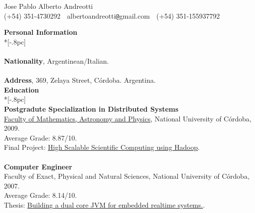 \documentclass[letter,11pt,english]{article}
\begin{document}
\pagestyle{headings}
\setcounter{page}{1}

\begin{center}
{\Large Jose Pablo Alberto Andreotti} \\[.5pc]
(+54) 351-4730292 $\;$ albertoandreotti\verb|@|gmail.com $\;$ (+54) 351-155937792 \\[3pc]
\end{center}
{\large \bf Personal Information} \\*[-.8pc]
\underline{\hspace{6in}} \\
\\
{\bf Nationality}, Argentinean/Italian.\\
\\
{\bf Address}, 369, Zelaya Street, C\'ordoba. Argentina.\\

{\large \bf Education} \\*[-.8pc]
\underline{\hspace{6in}} \\
{\bf Postgradute Specialization in Distributed Systems}\\
\href{http://www.famaf.unc.edu.ar/}{Faculty of Mathematics, Astronomy and Physics}, National University of C\'ordoba, 2009. \\
Average Grade: 8.87/10. \\
Final Project: \href{https://docs.google.com/viewer?a=v&pid=explorer&chrome=true&srcid=0B5AOpwg8IzVANjJlODZhZDctNWUzMS00MmNhLWI3OWMtMWNhMTdjODQwNjVl&hl=en}{High Scalable Scientific Computing using Hadoop}.\\
\\
{\bf Computer Engineer}\\
Faculty of Exact, Physical and Natural Sciences, National University of C\'ordoba, 2007.\\
Average Grade: 8.14/10. \\
Thesis: \href{https://docs.google.com/viewer?a=v&pid=explorer&chrome=true&srcid=1gdJXYgQtLDHDOxGDtbKzdmAl1LmNx-yo4w6vNl-K_Z-1YocLhtJxMvoqGvd1&hl=en}{Building a dual core JVM for embedded realtime systems.}.\\
\end{document}
